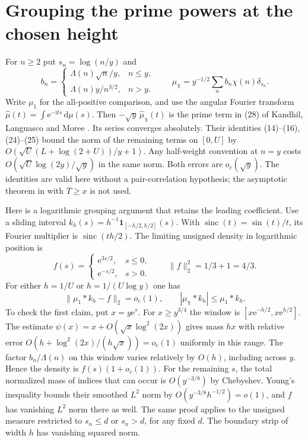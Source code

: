 \documentclass[11pt]{article}
\newcommand{\e}{\mathrm e}
\newcommand{\ii}{\mathrm i}
\newcommand{\dd}{\,\mathrm d}
\newcommand{\ind}{\mathbf1}
\begin{document}
\section{Grouping the prime powers at the chosen height}
For $n\ge2$ put $s_n=\log(n/y)$ and
\[
 b_n=\begin{cases}\Lambda(n)\sqrt n/y,&n\le y,\\
                    \Lambda(n)y/n^{3/2},&n>y.\end{cases}
 \qquad
 \mu_\chi=y^{-1/2}\sum_n b_n\chi(n)\delta_{s_n}.
\]
Write $\mu_1$ for the all-positive comparison, and use the angular
Fourier transform $\widehat\mu(t)=\int\e^{-\ii ts}\dd\mu(s)$.
Then $-\sqrt y\,\widehat\mu_\chi(t)$ is the prime term in (28) of
Kandhil, Languasco and Moree \cite{klm}. Its series converges absolutely.
Their identities (14)--(16), (24)--(25) bound the norm of the remaining
terms on $[0,U]$ by
$O(\sqrt U(L+\log(2+U))/y+1)$. Any half-weight convention at $n=y$
costs $O(\sqrt U\log(2y)/\sqrt y)$ in the same norm. Both errors
are $o_c(\sqrt y)$. The identities are valid here without a
pair-correlation hypothesis; the asymptotic theorem in \cite{klm}
with $T\ge x$ is not used.

Here is a logarithmic grouping argument that retains the leading
coefficient. Use a sliding interval
$k_h(s)=h^{-1}\ind_{[-h/2,h/2]}(s)$. With
$\operatorname{sinc}(t)=\sin(t)/t$, its Fourier multiplier is
$\operatorname{sinc}(th/2)$. The limiting unsigned density in
logarithmic position is
\[
 f(s)=\begin{cases}\e^{3s/2},&s\le0,\\ \e^{-s/2},&s>0.\end{cases}
 \qquad \|f\|_2^2=1/3+1=4/3 .
\]
For either $h=1/U$ or $h=1/(U\log y)$ one has
\[
 \|\mu_1*k_h-f\|_2=o_c(1),\qquad
 |\mu_\chi*k_h|\le \mu_1*k_h .
 \tag{2}
\]
To check the first claim, put $x=y\e^s$. For $x\ge y^{3/4}$ the
window is $[x\e^{-h/2},x\e^{h/2}]$. The estimate
$\psi(x)=x+O(\sqrt x\log^2(2x))$ gives mass $hx$ with relative error
$O(h+\log^2(2x)/(h\sqrt x))=o_c(1)$ uniformly in this range.
The factor $b_n/\Lambda(n)$ on this window varies relatively by
$O(h)$, including across $y$. Hence the density is $f(s)(1+o_c(1))$.
For the remaining $s$, the total normalized mass of indices that can
occur is $O(y^{-3/8})$ by Chebyshev. Young's inequality bounds their
smoothed $L^2$ norm by $O(y^{-3/8}h^{-1/2})=o(1)$, and $f$ has
vanishing $L^2$ norm there as well. The same proof applies to the
unsigned measure restricted to $s_n\le d$ or $s_n>d$, for any fixed
$d$. The boundary strip of width $h$ has vanishing squared norm.
\end{document}
